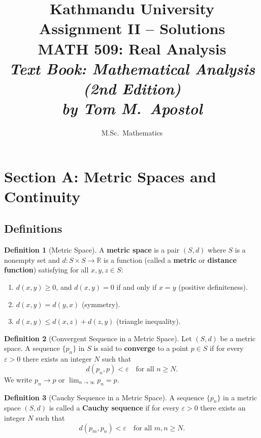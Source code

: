 \documentclass[12pt,a4paper]{article}
\title{
    \textbf{Kathmandu University} \\[0.5cm]
    \Large Assignment II -- Solutions \\[0.3cm]
    \large MATH 509: Real Analysis \\[0.3cm]
    \normalsize \textit{Text Book: Mathematical Analysis (2nd Edition)} \\
    \normalsize \textit{by Tom M.\ Apostol}
}
\author{M.Sc.\ Mathematics}
\date{}
\theoremstyle{definition}
\newtheorem{definition}{Definition}[section]
\newcommand{\R}{\mathbb{R}}
\newcommand{\eps}{\varepsilon}
\begin{document}
\maketitle
\tableofcontents
\newpage

\section{Section A: Metric Spaces and Continuity}

\subsection{Definitions}

\begin{definition}[Metric Space]
A \textbf{metric space} is a pair $(S, d)$ where $S$ is a nonempty set and $d: S \times S \to \R$ is a function (called a \textbf{metric} or \textbf{distance function}) satisfying for all $x, y, z \in S$:
\begin{enumerate}[label=(M\arabic*)]
    \item $d(x, y) \geq 0$, and $d(x, y) = 0$ if and only if $x = y$ \textup{(positive definiteness)}.
    \item $d(x, y) = d(y, x)$ \textup{(symmetry)}.
    \item $d(x, y) \leq d(x, z) + d(z, y)$ \textup{(triangle inequality)}.
\end{enumerate}
\end{definition}

\begin{definition}[Convergent Sequence in a Metric Space]
Let $(S, d)$ be a metric space. A sequence $\{p_n\}$ in $S$ is said to \textbf{converge} to a point $p \in S$ if for every $\eps > 0$ there exists an integer $N$ such that
\[
    d(p_n, p) < \eps \quad \text{for all } n \geq N.
\]
We write $p_n \to p$ or $\lim_{n \to \infty} p_n = p$.
\end{definition}

\begin{definition}[Cauchy Sequence in a Metric Space]
A sequence $\{p_n\}$ in a metric space $(S, d)$ is called a \textbf{Cauchy sequence} if for every $\eps > 0$ there exists an integer $N$ such that
\[
    d(p_m, p_n) < \eps \quad \text{for all } m, n \geq N.
\]
\end{definition}
\end{document}
